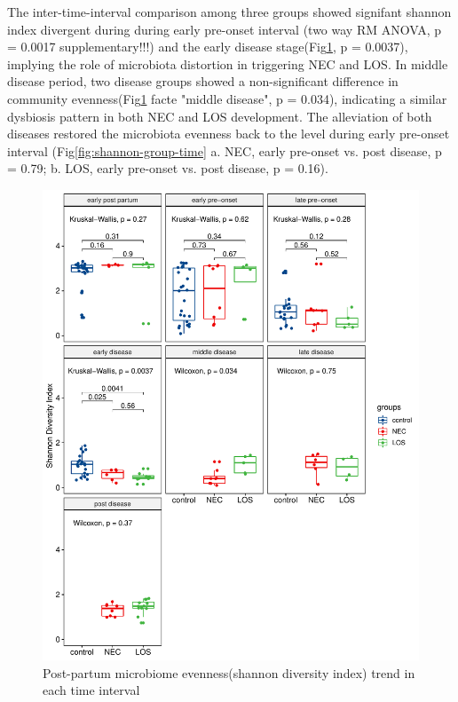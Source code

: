 \documentclass[fleqn,10pt,lineno]{wlpeerj} %
\begin{document}
    \noindent
    The inter-time-interval comparison among three groups showed signifant shannon index divergent during during early pre-onset interval (two way RM ANOVA, p = 0.0017 supplementary!!!) and the early disease stage(Fig\ref{fig:shannon-time-groups}, p = 0.0037), implying the role of microbiota distortion in triggering NEC and LOS. In middle disease period, two disease groups showed a non-significant difference in community evenness(Fig\ref{fig:shannon-time-groups} facte "middle disease", p = 0.034), indicating a similar dysbiosis pattern in both NEC and LOS development. The alleviation of both diseases restored the microbiota evenness back to the level during early pre-onset interval (Fig\ref{fig:shannon-group-time} a. NEC, early pre-onset vs. post disease, p = 0.79; b. LOS, early pre-onset vs. post disease, p = 0.16).
    \begin{figure}[ht]\centering
      \includegraphics[width=\linewidth]{figure/shannon-time-groups.pdf}
      \caption{Post-partum microbiome evenness(shannon diversity index) trend in each time interval}
      \label{fig:shannon-time-groups}
    \end{figure}
\end{document}
